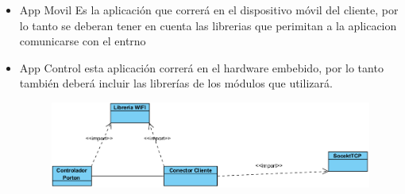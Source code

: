 \documentclass[16pt, article,notitlepage]{article}
\begin{document}
\begin{itemize}
	\item App Movil Es la aplicación que correrá en el dispositivo móvil del cliente, por lo tanto se deberan tener en cuenta las librerias que perimitan a la aplicacion comunicarse con el entrno
	\begin{figure}[H]
	\end{figure}
	\item App Control esta aplicación correrá en el hardware embebido, por lo tanto también deberá incluir las librerías de los módulos que utilizará.
	\begin{figure}[H]
		\centering \includegraphics[width=0.8\linewidth]{./images/AppControl.png}
	\end{figure}
\end{itemize}
\end{document}
